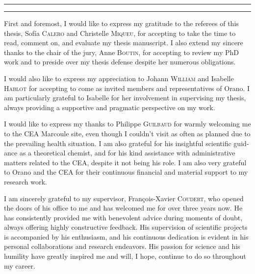 \begin{otherlanguage}{english}

\hrule\relax
\vspace*{.9\baselineskip}%
\raggedright{\huge{}}\par%
\vspace*{1.1\baselineskip}%
\hrule\relax
\vspace*{\baselineskip}%
\thispagestyle{empty}

\begingroup
\itshape

First and foremost, I would like to express my gratitude to the referees of this thesis, Sof{\'{i}}a \textsc{Calero} and Christelle \textsc{Miqueu}, for accepting to take the time to read, comment on, and evaluate my thesis manuscript. 
I also extend my sincere thanks to the chair of the jury, Anne \textsc{Boutin}, for accepting to review my PhD work and to preside over my thesis defense despite her numerous obligations.

I would also like to express my appreciation to Johann \textsc{William} and Isabelle \textsc{Hablot} for accepting to come as invited members and representatives of Orano. I am particularly grateful to Isabelle for her involvement in supervising my thesis, always providing a supportive and pragmatic perspective on my work.

I would like to express my thanks to Philippe \textsc{Guilbaud} for warmly welcoming me to the CEA Marcoule site, even though I couldn't visit as often as planned due to the prevailing health situation. I am also grateful for his insightful scientific guidance as a theoretical chemist, and for his kind assistance with administrative matters related to the CEA, despite it not being his role. I am also very grateful to Orano and the CEA for their continuous financial and material support to my research work.

I am sincerely grateful to my supervisor, François-Xavier \textsc{Coudert}, who opened the doors of his office to me and has welcomed me for over three years now. He has consistently provided me with benevolent advice during moments of doubt, always offering highly constructive feedback. His supervision of scientific projects is accompanied by his enthusiasm, and his continuous dedication is evident in his personal collaborations and research endeavors. His passion for science and his humility have greatly inspired me and will, I hope, continue to do so throughout my career.


\end{otherlanguage}
